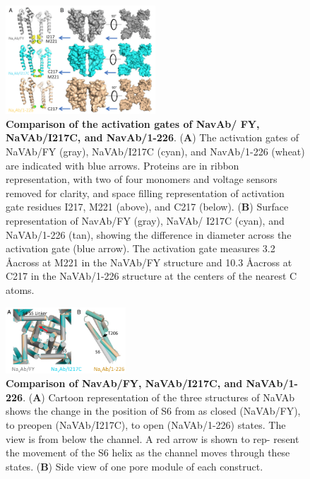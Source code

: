 \begin{refsection}
{\begin{figure}[!htb]
\centering
\includegraphics[width=0.5\textwidth]{navopen/NavOFig6}
\caption[Comparison of the activation gates of NavAb/ FY, NaVAb/I217C, and NavAb/1-226]{\textbf{Comparison of the activation gates of NavAb/ FY, NaVAb/I217C, and NavAb/1-226}. (\textbf{A}) The activation gates of NaVAb/FY (gray), NaVAb/I217C (cyan), and NavAb/1-226 (wheat) are indicated with blue arrows. Proteins are in ribbon representation, with two of four monomers and voltage sensors removed for clarity, and space filling representation of activation gate residues I217, M221 (above), and C217 (below). (\textbf{B}) Surface representation of NavAb/FY (gray), NaVAb/ I217C (cyan), and NaVAb/1-226 (tan), showing the difference in diameter across the activation gate (blue arrow). The activation gate measures 3.2 \AA across at M221 in the NaVAb/FY structure and 10.3 \AA across at C217 in the NaVAb/1-226 structure at the centers of the nearest C atoms.}
\label{fig:navofig6}
\end{figure}

\begin{figure}[!htb]
\centering
\includegraphics[width=0.4\textwidth]{navopen/NavOFig7}
\caption[Comparison of NavAb/FY, NaVAb/I217C, and NaVAb/1-226]{\textbf{Comparison of NavAb/FY, NaVAb/I217C, and NaVAb/1-226}. (\textbf{A}) Cartoon representation of the three structures of NaVAb shows the change in the position of S6 from as closed (NaVAb/FY), to preopen (NaVAb/I217C), to open (NaVAb/1-226) states. The view is from below the channel. A red arrow is shown to rep- resent the movement of the S6 helix as the channel moves through these states. (\textbf{B}) Side view of one pore module of each construct.}
\label{fig:navofig7}
\end{figure}

}
\end{refsection}
